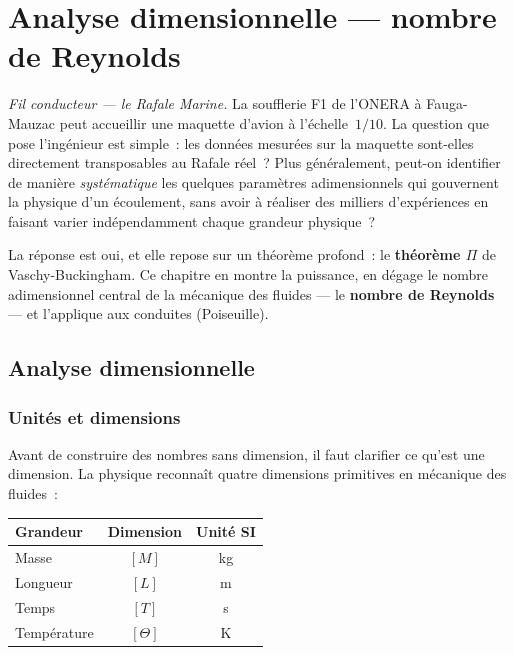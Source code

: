 \documentclass[11pt,a4paper]{report}
\begin{document}
\chapter{Analyse dimensionnelle --- nombre de Reynolds}

\noindent
\textit{Fil conducteur --- le Rafale Marine.}
La soufflerie F1 de l'ONERA à Fauga-Mauzac peut accueillir une maquette d'avion
à l'échelle~$1/10$. La question que pose l'ingénieur est simple~: les données
mesurées sur la maquette sont-elles directement transposables au Rafale réel~?
Plus généralement, peut-on identifier de manière \emph{systématique} les quelques
paramètres adimensionnels qui gouvernent la physique d'un écoulement, sans avoir
à réaliser des milliers d'expériences en faisant varier indépendamment chaque
grandeur physique~?

La réponse est oui, et elle repose sur un théorème profond~: le
\textbf{théorème $\Pi$} de Vaschy-Buckingham. Ce chapitre en montre la puissance,
en dégage le nombre adimensionnel central de la mécanique des fluides --- le
\textbf{nombre de Reynolds} --- et l'applique aux conduites (Poiseuille).

\section{Analyse dimensionnelle}

\subsection{Unités et dimensions}

Avant de construire des nombres sans dimension, il faut clarifier ce qu'est
une dimension. La physique reconnaît quatre dimensions primitives en mécanique
des fluides~:

\begin{center}
\renewcommand{\arraystretch}{1.3}
\begin{tabular}{lcc}
\toprule
\textbf{Grandeur} & \textbf{Dimension} & \textbf{Unité SI} \\
\midrule
Masse      & $[M]$ & kg \\
Longueur   & $[L]$ & m  \\
Temps      & $[T]$ & s  \\
Température& $[\Theta]$ & K \\
\bottomrule
\end{tabular}
\end{center}
\end{document}
